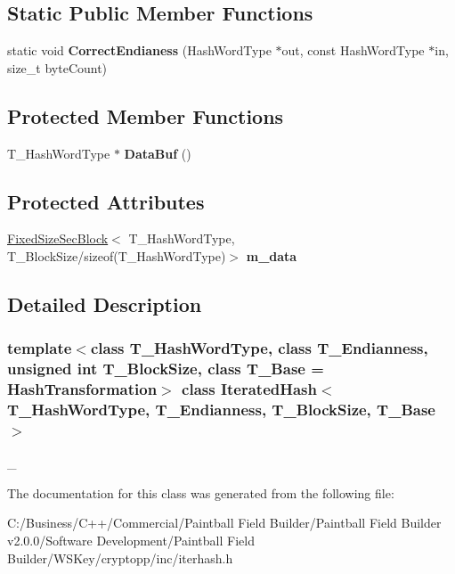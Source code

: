 \subsection*{Static Public Member Functions}
\begin{DoxyCompactItemize}
\item 
\hypertarget{class_iterated_hash_a394a6ed0dd2a885652cd203ad4fa5fe0}{
static void {\bfseries CorrectEndianess} (HashWordType $\ast$out, const HashWordType $\ast$in, size\_\-t byteCount)}
\label{class_iterated_hash_a394a6ed0dd2a885652cd203ad4fa5fe0}

\end{DoxyCompactItemize}
\subsection*{Protected Member Functions}
\begin{DoxyCompactItemize}
\item 
\hypertarget{class_iterated_hash_aa7561b749600677c9a28bcf4d943e272}{
T\_\-HashWordType $\ast$ {\bfseries DataBuf} ()}
\label{class_iterated_hash_aa7561b749600677c9a28bcf4d943e272}

\end{DoxyCompactItemize}
\subsection*{Protected Attributes}
\begin{DoxyCompactItemize}
\item 
\hypertarget{class_iterated_hash_ad1d059e2cba2115f403befa9e6c070da}{
\hyperlink{class_fixed_size_sec_block}{FixedSizeSecBlock}$<$ T\_\-HashWordType, T\_\-BlockSize/sizeof(T\_\-HashWordType)$>$ {\bfseries m\_\-data}}
\label{class_iterated_hash_ad1d059e2cba2115f403befa9e6c070da}

\end{DoxyCompactItemize}


\subsection{Detailed Description}
\subsubsection*{template$<$class T\_\-HashWordType, class T\_\-Endianness, unsigned int T\_\-BlockSize, class T\_\-Base = HashTransformation$>$ class IteratedHash$<$ T\_\-HashWordType, T\_\-Endianness, T\_\-BlockSize, T\_\-Base $>$}

\_\- 

The documentation for this class was generated from the following file:\begin{DoxyCompactItemize}
\item 
C:/Business/C++/Commercial/Paintball Field Builder/Paintball Field Builder v2.0.0/Software Development/Paintball Field Builder/WSKey/cryptopp/inc/iterhash.h\end{DoxyCompactItemize}
